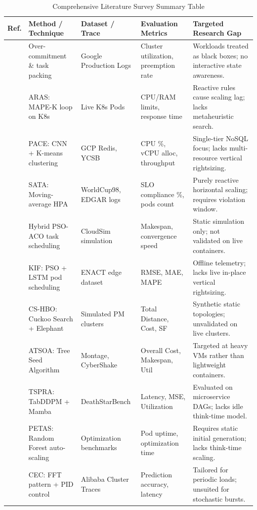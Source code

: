 \documentclass[12pt,a4paper]{report}
\begin{document}
	\begin{table}[htbp]
		\centering
		\scriptsize
		\caption{Comprehensive Literature Survey Summary Table}
		\label{tab:litsum}
		\begin{tabularx}{\linewidth}{@{}p{0.8cm}p{2.8cm}p{2.3cm}p{3.2cm}X@{}}
			\toprule
			\textbf{Ref.} & \textbf{Method / Technique} & \textbf{Dataset / Trace} & \textbf{Evaluation Metrics} & \textbf{Targeted Research Gap} \\ \midrule
			\cite{borg} & Over-commitment \& task packing & Google Production Logs & Cluster utilization, preemption rate & Workloads treated as black boxes; no interactive state awareness. \\
			\cite{aras} & ARAS: MAPE-K loop on K8s & Live K8s Pods & CPU/RAM limits, response time & Reactive rules cause scaling lag; lacks metaheuristic search. \\
			\cite{pace} & PACE: CNN + K-means clustering & GCP Redis, YCSB & CPU \%, vCPU alloc, throughput & Single-tier NoSQL focus; lacks multi-resource vertical rightsizing. \\
			\cite{sata} & SATA: Moving-average HPA & WorldCup98, EDGAR logs & SLO compliance \%, pods count & Purely reactive horizontal scaling; requires violation window. \\
			\cite{psoaco} & Hybrid PSO-ACO task scheduling & CloudSim simulation & Makespan, convergence speed & Static simulation only; not validated on live containers. \\
			\cite{pso_lstm} & KIF: PSO + LSTM pod scheduling & ENACT edge dataset & RMSE, MAE, MAPE & Offline telemetry; lacks live in-place vertical rightsizing. \\
			\cite{cshbo} & CS-HBO: Cuckoo Search + Elephant & Simulated PM clusters & Total Distance, Cost, SF & Synthetic static topologies; unvalidated on live clusters. \\
			\cite{atsoa} & ATSOA: Tree Seed Algorithm & Montage, CyberShake & Overall Cost, Makespan, Util & Targeted at heavy VMs rather than lightweight containers. \\
			\cite{tspra} & TSPRA: TabDDPM + Mamba & DeathStarBench & Latency, MSE, Utilization & Evaluated on microservice DAGs; lacks idle think-time model. \\
			\cite{petas} & PETAS: Random Forest auto-scaling & Optimization benchmarks & Pod uptime, optimization time & Requires static initial generation; lacks think-time scaling. \\
			\cite{cec} & CEC: FFT pattern + PID control & Alibaba Cluster Traces & Prediction accuracy, latency & Tailored for periodic loads; unsuited for stochastic bursts. \\

\end{tabularx}
\end{table}
\end{document}
